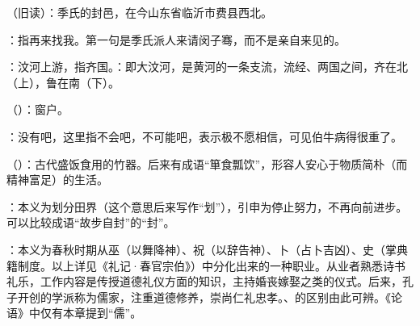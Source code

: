 {
\item {}（旧读）：季氏的封邑，在今山东省临沂市费县西北。%
\item {}：指再来找我。第一句是季氏派人来请闵子骞，而不是亲自来见的。

\item {}：汶河上游，指齐国。：即大汶河，是黄河的一条支流，流经、两国之间，齐在北（上），鲁在南（下）。
}
{}


{
\item {}（）：窗户。
\item {}：没有吧，这里指不会吧，不可能吧，表示极不愿相信，可见伯牛病得很重了。
}
{}


{
\item {}（）：古代盛饭食用的竹器。后来有成语“箪食瓢饮”，形容人安心于物质简朴（而精神富足）的生活。%
}
{}


{
\item {}：本义为划分田界（这个意思后来写作“划”），引申为停止努力，不再向前进步。可以比较成语“故步自封”的“封”。
}
{}  %


{
\item {}：本义为春秋时期从巫（以舞降神）、祝（以辞告神）、卜（占卜吉凶）、史（掌典籍制度。以上详见《礼记·春官宗伯》）中分化出来的一种职业。从业者熟悉诗书礼乐，工作内容是传授道德礼仪方面的知识，主持婚丧嫁娶之类的仪式。后来，孔子开创的学派称为儒家，注重道德修养，崇尚仁礼忠孝。、的区别由此可辨。《论语》中仅有本章提到“儒”。
}
{}


